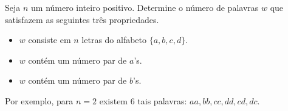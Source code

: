 Seja \(n\) um número inteiro positivo. Determine o número de palavras \(w\) que satisfazem as seguintes três propriedades.
\begin{itemize}
    \item[i.] \(w\) consiste em \(n\) letras do alfabeto \(\{a,b,c,d\}.\)
    \item[ii.] \(w\) contém um número par de \(a\)'s.
    \item[iii.] \(w\) contém um número par de \(b\)'s.
\end{itemize}
Por exemplo, para \(n=2\) existem \(6\) tais palavras: \(aa, bb, cc, dd, cd, dc.\)
